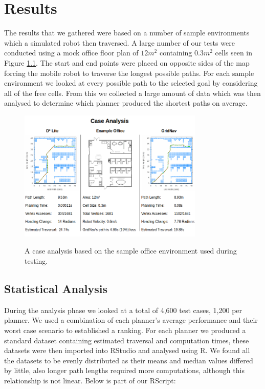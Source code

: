 \chapter{Results}


\noindent
The results that we gathered were based on a number of sample environments which a simulated robot then traversed. A large number of our tests were conducted using a mock office floor plan of $12m^{2}$ containing $0.3m^{2}$ cells seen in Figure \ref{path_comparison}. The start and end points were placed on opposite sides of the map forcing the mobile robot to traverse the longest possible paths. For each sample environment we looked at every possible path to the selected goal by considering all of the free cells. From this we collected a large amount of data which was then analysed to determine which planner produced the shortest paths on average.

\begin{figure}[htbp]

\center \includegraphics[width=250pt]{illustrations/floor_plan}\\
\caption{A case analysis based on the sample office environment used during testing.} 
\label{path_comparison}

\end{figure}

\section{Statistical Analysis}
\noindent
During the analysis phase we looked at a total of 4,600 test cases, 1,200 per planner. We used a combination of each planner's average performance and their worst case scenario to established a ranking. For each planner we produced a standard dataset containing estimated traversal and computation times, these datasets were then imported into RStudio and analysed using R. We found all the datasets to be evenly distributed as their means and median values differed by little, also longer path lengths required more computations, although this relationship is not linear. Below is part of our RScript: \\

